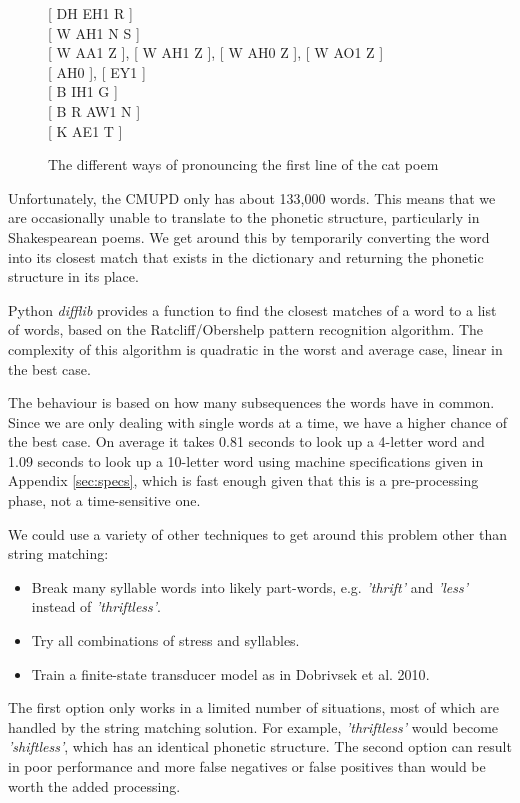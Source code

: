 \begin{figure}
\centering
{[ DH EH1 R ]}\\
{[ W AH1 N S ]}\\
{[ W AA1 Z ], [ W AH1 Z ], [ W AH0 Z ], [ W AO1 Z ]}\\
{[ AH0 ], [ EY1 ]}\\
{[ B IH1 G ]}\\
{[ B R AW1 N ]}\\
{[ K AE1 T ]}
\caption{The different ways of pronouncing the first line of the cat poem}
\label{fig:catpronun}
\end{figure}

Unfortunately, the CMUPD only has about 133,000 words. This means that we are occasionally unable to translate to the phonetic structure, particularly in Shakespearean poems. We get around this by temporarily converting the word into its closest match that exists in the dictionary and returning the phonetic structure in its place.

Python \textit{difflib}\cite{difflib} provides a function to find the closest matches of a word to a list of words, based on the Ratcliff/Obershelp pattern recognition algorithm. The complexity of this algorithm is quadratic in the worst and average case, linear in the best case. 

The behaviour is based on  how many subsequences the words have in common. Since we are only dealing with single words at a time, we have a higher chance of the best case. On average it takes 0.81 seconds to look up a 4-letter word and 1.09 seconds to look up a 10-letter word using machine specifications given in Appendix \ref{sec:specs}, which is fast enough given that this is a pre-processing phase, not a time-sensitive one.

We could use a variety of other techniques to get around this problem other than string matching:
\begin{itemize}
\item{Break many syllable words into likely part-words, e.g. \textit{'thrift'} and \textit{'less'} instead of \textit{'thriftless'}.}
\item{Try all combinations of stress and syllables.}
\item{Train a finite-state transducer model as in Dobrivsek et al. 2010\cite{dobrivsek2010towards}.}
\end{itemize}

The first option only works in a limited number of situations, most of which are handled by the string matching solution. For example, \textit{'thriftless'} would become \textit{'shiftless'}, which has an identical phonetic structure. The second option can result in poor performance and more false negatives or false positives than would be worth the added processing.

